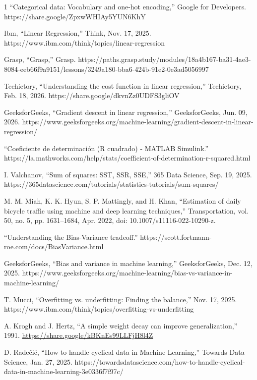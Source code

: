 \documentclass[10pt,journal,compsoc]{IEEEtran}
\begin{document}
\begin{thebibliography}{1}
“Categorical data: Vocabulary and one-hot encoding,” Google for Developers. https://share.google/ZpxwWHIAy5YUN6KhY

Ibm, “Linear Regression,” Think, Nov. 17, 2025. https://www.ibm.com/think/topics/linear-regression

Grasp, “Grasp,” Grasp. https://paths.grasp.study/modules/18a4b167-ba31-4ae3-8084-eeb66f9a9151/lessons/3249a180-bba6-424b-91e2-0e3ad5056997

Techietory, “Understanding the cost function in linear regression,” Techietory, Feb. 18, 2026. https://share.google/dkvnZz0UDFS3gliOV

GeeksforGeeks, “Gradient descent in linear regression,” GeeksforGeeks, Jun. 09, 2026. https://www.geeksforgeeks.org/machine-learning/gradient-descent-in-linear-regression/

“Coeficiente de determinación (R cuadrado) - MATLAB  Simulink.” https://la.mathworks.com/help/stats/coefficient-of-determination-r-squared.html 

I. Valchanov, “Sum of squares: SST, SSR, SSE,” 365 Data Science, Sep. 19, 2025. https://365datascience.com/tutorials/statistics-tutorials/sum-squares/

M. M. Miah, K. K. Hyun, S. P. Mattingly, and H. Khan, “Estimation of daily bicycle traffic using machine and deep learning techniques,” Transportation, vol. 50, no. 5, pp. 1631–1684, Apr. 2022, doi: 10.1007/s11116-022-10290-z.

“Understanding the Bias-Variance tradeoff.” https://scott.fortmann-roe.com/docs/BiasVariance.html

GeeksforGeeks, “Bias and variance in machine learning,” GeeksforGeeks, Dec. 12, 2025. https://www.geeksforgeeks.org/machine-learning/bias-vs-variance-in-machine-learning/

T. Mucci, “Overfitting vs. underfitting: Finding the balance,” Nov. 17, 2025. https://www.ibm.com/think/topics/overfitting-vs-underfitting

A. Krogh and J. Hertz, “A simple weight decay can improve generalization,” 1991. \url{https://share.google/kBKnEs99LLFjH8l4Z}

D. Radečić, “How to handle cyclical data in Machine Learning,” Towards Data Science, Jan. 27, 2025. https://towardsdatascience.com/how-to-handle-cyclical-data-in-machine-learning-3e0336f7f97c/

\end{thebibliography}
\end{document}
